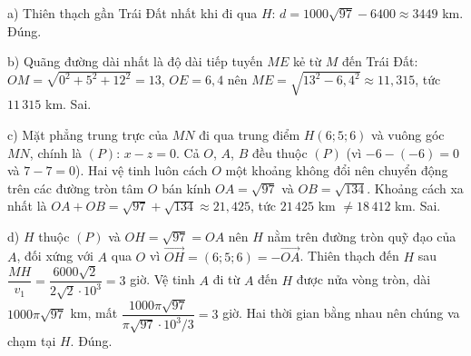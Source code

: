 \begin{ex}
{a) Thiên thạch gần Trái Đất nhất khi đi qua $H$: $d=1000\sqrt{97}-6400\approx3449$ km. Đúng.

b) Quãng đường dài nhất là độ dài tiếp tuyến $ME$ kẻ từ $M$ đến Trái Đất: $OM=\sqrt{0^2+5^2+12^2}=13$, $OE=6{,}4$ nên $ME=\sqrt{13^2-6{,}4^2}\approx11{,}315$, tức $11\,315$ km. Sai.

c) Mặt phẳng trung trực của $MN$ đi qua trung điểm $H(6;5;6)$ và vuông góc $MN$, chính là $(P)$: $x-z=0$. Cả $O$, $A$, $B$ đều thuộc $(P)$ (vì $-6-(-6)=0$ và $7-7=0$). Hai vệ tinh luôn cách $O$ một khoảng không đổi nên chuyển động trên các đường tròn tâm $O$ bán kính $OA=\sqrt{97}$ và $OB=\sqrt{134}$. Khoảng cách xa nhất là $OA+OB=\sqrt{97}+\sqrt{134}\approx21{,}425$, tức $21\,425$ km $\ne18\,412$ km. Sai.

d) $H$ thuộc $(P)$ và $OH=\sqrt{97}=OA$ nên $H$ nằm trên đường tròn quỹ đạo của $A$, đối xứng với $A$ qua $O$ vì $\overrightarrow{OH}=(6;5;6)=-\overrightarrow{OA}$. Thiên thạch đến $H$ sau $\dfrac{MH}{v_1}=\dfrac{6000\sqrt2}{2\sqrt2\cdot10^3}=3$ giờ. Vệ tinh $A$ đi từ $A$ đến $H$ được nửa vòng tròn, dài $1000\pi\sqrt{97}$ km, mất $\dfrac{1000\pi\sqrt{97}}{\pi\sqrt{97}\cdot10^3/3}=3$ giờ. Hai thời gian bằng nhau nên chúng va chạm tại $H$. Đúng.}
\end{ex}
